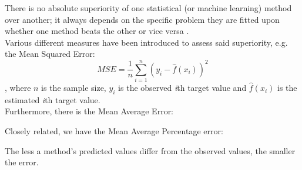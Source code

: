 \documentclass[12pt,titlepage]{article}
\begin{document}
There is no absolute superiority of one statistical (or machine learning) method over another; it always depends on the specific problem they are fitted upon whether one method beats the other or vice versa \citep{Hastie.2017}. \\
Various different measures have been introduced to assess said superiority, e.g. the Mean Squared Error:
\begin{equation}
MSE = \frac{1}{n}\sum_{i = 1}^{n}(y_{i}-\hat{f}(x_{i}))^2
\end{equation}
, where $n$ is the sample size, $y_{i}$ is the observed \textit{i}th target value and $\hat{f}(x_{i})$ is the estimated \textit{i}th target value. \\
Furthermore, there is the Mean Average Error:

Closely related, we have the Mean Average Percentage error:


The less a method's predicted values differ from the observed values, the smaller the error.





\end{document}
